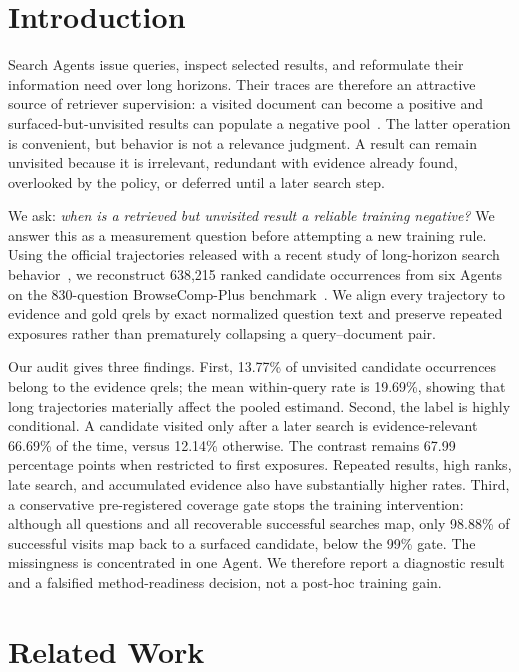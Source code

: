 \section{Introduction}

Search Agents issue queries, inspect selected results, and reformulate their information need over long horizons. Their traces are therefore an attractive source of retriever supervision: a visited document can become a positive and surfaced-but-unvisited results can populate a negative pool~\cite{zhou2026lrat}. The latter operation is convenient, but behavior is not a relevance judgment. A result can remain unvisited because it is irrelevant, redundant with evidence already found, overlooked by the policy, or deferred until a later search step.

We ask: \emph{when is a retrieved but unvisited result a reliable training negative?} We answer this as a measurement question before attempting a new training rule. Using the official trajectories released with a recent study of long-horizon search behavior~\cite{liu2026diagnosing}, we reconstruct 638,215 ranked candidate occurrences from six Agents on the 830-question BrowseComp-Plus benchmark~\cite{chen2025browsecompplus}. We align every trajectory to evidence and gold qrels by exact normalized question text and preserve repeated exposures rather than prematurely collapsing a query--document pair.

Our audit gives three findings. First, 13.77\% of unvisited candidate occurrences belong to the evidence qrels; the mean within-query rate is 19.69\%, showing that long trajectories materially affect the pooled estimand. Second, the label is highly conditional. A candidate visited only after a later search is evidence-relevant 66.69\% of the time, versus 12.14\% otherwise. The contrast remains 67.99 percentage points when restricted to first exposures. Repeated results, high ranks, late search, and accumulated evidence also have substantially higher rates. Third, a conservative pre-registered coverage gate stops the training intervention: although all questions and all recoverable successful searches map, only 98.88\% of successful visits map back to a surfaced candidate, below the 99\% gate. The missingness is concentrated in one Agent. We therefore report a diagnostic result and a falsified method-readiness decision, not a post-hoc training gain.

\section{Related Work}

